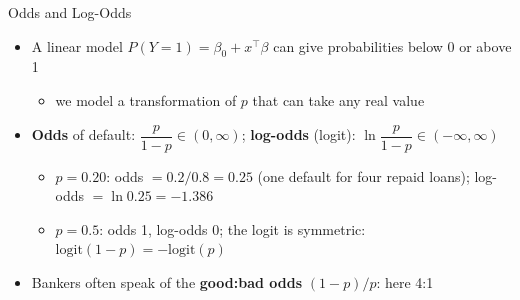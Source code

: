 \begin{frame}{Odds and Log-Odds}
\itemsize{\small}
\begin{itemize}
    \item A linear model $P(Y = 1) = \beta_0 + x^\top\beta$ can give probabilities below 0 or above 1
    \begin{itemize}
        \item we model a transformation of $p$ that can take any real value
    \end{itemize}
    \item \textbf{Odds} of default: $\dfrac{p}{1 - p} \in (0, \infty)$; \textbf{log-odds} (logit): $\ln\dfrac{p}{1 - p} \in (-\infty, \infty)$
    \begin{itemize}
        \item $p = 0.20$: odds $= 0.2/0.8 = 0.25$ (one default for four repaid loans); log-odds $= \ln 0.25 = -1.386$
        \item $p = 0.5$: odds 1, log-odds 0; the logit is symmetric: $\mathrm{logit}(1 - p) = -\mathrm{logit}(p)$
    \end{itemize}
    \item Bankers often speak of the \textbf{good:bad odds} $(1 - p)/p$: here 4:1
\end{itemize}
\end{frame}

